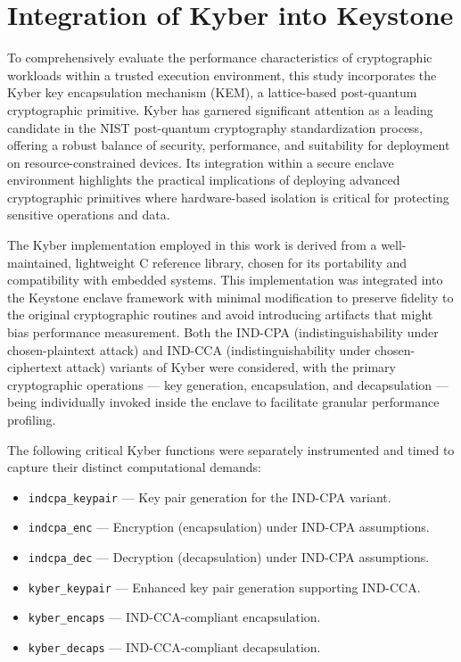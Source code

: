 \section{Integration of Kyber into Keystone}
\label{sec:kyber-enclave}

To comprehensively evaluate the performance characteristics of cryptographic workloads within a trusted execution environment, this study incorporates the Kyber key encapsulation mechanism (KEM), a lattice-based post-quantum cryptographic primitive. Kyber has garnered significant attention as a leading candidate in the NIST post-quantum cryptography standardization process, offering a robust balance of security, performance, and suitability for deployment on resource-constrained devices. Its integration within a secure enclave environment highlights the practical implications of deploying advanced cryptographic primitives where hardware-based isolation is critical for protecting sensitive operations and data.

The Kyber implementation employed in this work is derived from a well-maintained, lightweight C reference library, chosen for its portability and compatibility with embedded systems. This implementation was integrated into the Keystone enclave framework with minimal modification to preserve fidelity to the original cryptographic routines and avoid introducing artifacts that might bias performance measurement. Both the IND-CPA (indistinguishability under chosen-plaintext attack) and IND-CCA (indistinguishability under chosen-ciphertext attack) variants of Kyber were considered, with the primary cryptographic operations — key generation, encapsulation, and decapsulation — being individually invoked inside the enclave to facilitate granular performance profiling.

The following critical Kyber functions were separately instrumented and timed to capture their distinct computational demands:

\begin{itemize}
    \item \texttt{indcpa\_keypair} — Key pair generation for the IND-CPA variant.
    \item \texttt{indcpa\_enc} — Encryption (encapsulation) under IND-CPA assumptions.
    \item \texttt{indcpa\_dec} — Decryption (decapsulation) under IND-CPA assumptions.
    \item \texttt{kyber\_keypair} — Enhanced key pair generation supporting IND-CCA.
    \item \texttt{kyber\_encaps} — IND-CCA-compliant encapsulation.
    \item \texttt{kyber\_decaps} — IND-CCA-compliant decapsulation.
\end{itemize}

